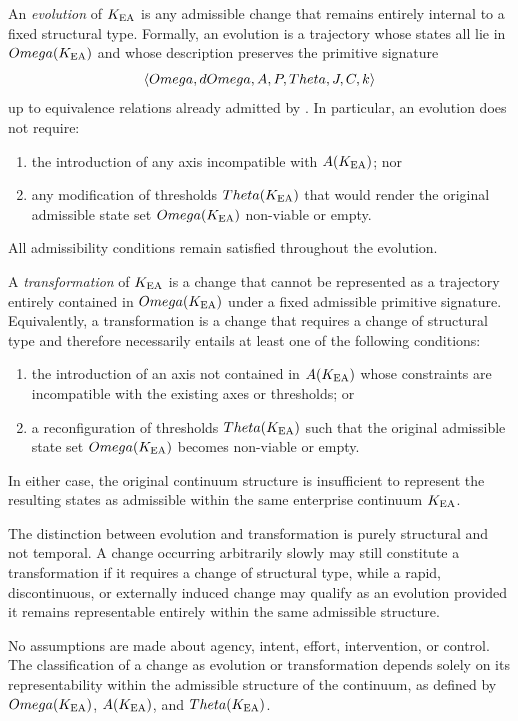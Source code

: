﻿\begin{definition}
An \emph{evolution} of $K_{\mathrm{EA}}$ is any admissible change that remains entirely
internal to a fixed structural type. Formally, an evolution is a trajectory
whose states all lie in $Omega(K_{\mathrm{EA}})$ and whose description preserves the
primitive signature
\[
\langle Omega, dOmega, A, P, Theta, J, C, k \rangle
\]
up to equivalence relations already admitted by \OC. In particular, an
evolution does not require:
\begin{enumerate}
  \item the introduction of any axis incompatible with $A(K_{\mathrm{EA}})$; nor
  \item any modification of thresholds $Theta(K_{\mathrm{EA}})$ that would render the
  original admissible state set $Omega(K_{\mathrm{EA}})$ non-viable or empty.
\end{enumerate}
All admissibility conditions remain satisfied throughout the evolution.
\end{definition}

\begin{definition}
A \emph{transformation} of $K_{\mathrm{EA}}$ is a change that cannot be represented as a
trajectory entirely contained in $Omega(K_{\mathrm{EA}})$ under a fixed admissible primitive
signature. Equivalently, a transformation is a change that requires a change of
structural type and therefore necessarily entails at least one of the following
conditions:
\begin{enumerate}
  \item the introduction of an axis not contained in $A(K_{\mathrm{EA}})$ whose
  constraints are incompatible with the existing axes or thresholds; or
  \item a reconfiguration of thresholds $Theta(K_{\mathrm{EA}})$ such that the original
  admissible state set $Omega(K_{\mathrm{EA}})$ becomes non-viable or empty.
\end{enumerate}
In either case, the original continuum structure is insufficient to represent
the resulting states as admissible within the same enterprise continuum
$K_{\mathrm{EA}}$.
\end{definition}

\begin{remark}
The distinction between evolution and transformation is purely structural and
not temporal. A change occurring arbitrarily slowly may still constitute a
transformation if it requires a change of structural type, while a rapid,
discontinuous, or externally induced change may qualify as an evolution
provided it remains representable entirely within the same admissible
structure.
\end{remark}

\begin{remark}
No assumptions are made about agency, intent, effort, intervention, or control.
The classification of a change as evolution or transformation depends solely on
its representability within the admissible structure of the continuum, as
defined by $Omega(K_{\mathrm{EA}})$, $A(K_{\mathrm{EA}})$, and $Theta(K_{\mathrm{EA}})$.
\end{remark}
